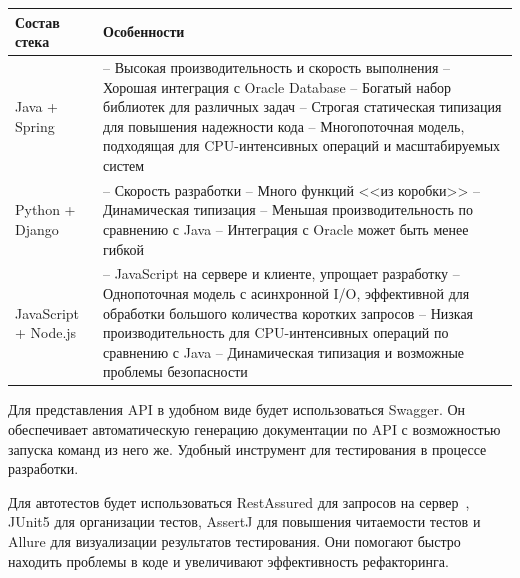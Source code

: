 \documentclass[a4paper,article]{article}
\begin{document}
\begin{sloppypar}
\begin{xltabular}{\textwidth} { |
        >{\hsize} X |
        >{\hsize} X | }
        \hline
        Состав стека
        & Особенности \\

        \hline
        Java + Spring
        & -- Высокая производительность и скорость выполнения \newline -- Хорошая интеграция с Oracle Database \newline -- Богатый набор библиотек для различных задач \newline -- Строгая статическая типизация для повышения надежности кода \newline -- Многопоточная модель, подходящая для CPU-интенсивных операций и масштабируемых систем \\

        \hline
        Python + Django
        & -- Скорость разработки \newline -- Много функций <<из коробки>> \newline -- Динамическая типизация \newline -- Меньшая производительность по сравнению с Java \newline -- Интеграция с Oracle может быть менее гибкой \\

        \hline
        JavaScript + Node.js
        & -- JavaScript на сервере и клиенте, упрощает разработку \newline -- Однопоточная модель с асинхронной I/O, эффективной для обработки большого количества коротких запросов \newline -- Низкая производительность для CPU-интенсивных операций по сравнению с Java \newline -- Динамическая типизация и возможные проблемы безопасности \\

        \hline
    \end{xltabular}
    
    \newpage

    Для представления API в удобном виде будет использоваться Swagger. Он обеспечивает автоматическую генерацию документации по API с возможностью запуска команд из него же. Удобный инструмент для тестирования в процессе разработки.

    Для автотестов будет использоваться RestAssured для запросов на сервер~\cite{restassured}, JUnit5 для организации тестов, AssertJ для повышения читаемости тестов и Allure для визуализации результатов тестирования. Они помогают быстро находить проблемы в коде и увеличивают эффективность рефакторинга.


\end{sloppypar}
\end{document}
